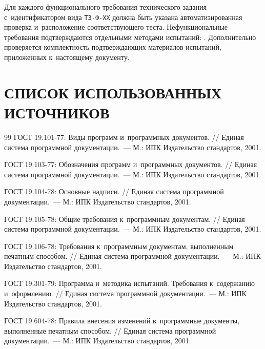 \documentclass[12pt,a4paper]{extarticle}
\begin{document}
\begin{hseExample}
Для каждого функционального требования технического задания с~идентификатором вида \texttt{ТЗ-Ф-XX} должна быть указана автоматизированная проверка и~расположение соответствующего теста. Нефункциональные требования подтверждаются отдельными методами испытаний: . Дополнительно проверяется комплектность подтверждающих материалов испытаний, приложенных к~настоящему документу.
\end{hseExample}

\clearpage
\pagestyle{appendix}

\section*{СПИСОК ИСПОЛЬЗОВАННЫХ ИСТОЧНИКОВ}

\renewcommand{\refname}{}
\begin{thebibliography}{99}
ГОСТ 19.101-77: Виды программ и~программных документов. // Единая система программной документации.~--- М.: ИПК Издательство стандартов, 2001.

ГОСТ 19.103-77: Обозначения программ и~программных документов. // Единая система программной документации.~--- М.: ИПК Издательство стандартов, 2001.

ГОСТ 19.104-78: Основные надписи. // Единая система программной документации.~--- М.: ИПК Издательство стандартов, 2001.

ГОСТ 19.105-78: Общие требования к~программным документам. // Единая система программной документации.~--- М.: ИПК Издательство стандартов, 2001.

ГОСТ 19.106-78: Требования к~программным документам, выполненным печатным способом. // Единая система программной документации.~--- М.: ИПК Издательство стандартов, 2001.

ГОСТ 19.301-79: Программа и~методика испытаний. Требования к~содержанию и~оформлению. // Единая система программной документации.~--- М.: ИПК Издательство стандартов, 2001.

ГОСТ 19.604-78: Правила внесения изменений в~программные документы, выполненные печатным способом. // Единая система программной документации.~--- М.: ИПК Издательство стандартов, 2001.
\end{thebibliography}


\clearpage


\end{document}
